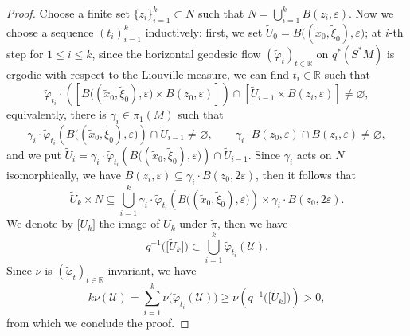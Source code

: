 \documentclass[11pt,oneside,reqno]{amsart}
\theoremstyle{definition}
\numberwithin{equation}{section}
\theoremstyle{plain}
\begin{document}
\begin{proof}
Choose a finite set $\{z_i\}_{i=1}^k \subset N$ such that $N=\bigcup_{i=1}^k B(z_i, \varepsilon)$. Now we choose a sequence $(t_i)_{i=1}^k$ inductively: first, we set $\widetilde{U}_0=B\big((\widetilde{x}_0, \widetilde{\xi}_0), \varepsilon\big)$; at $i$-th step for $1 \leq i \leq k$, since the horizontal geodesic flow $(\widetilde{\varphi}_t)_{t \in \mathbb{R}}$ on $q^*(S^*M)$ is ergodic with respect to the Liouville measure, we can find $t_i \in \mathbb{R}$ such that
\begin{equation*}
    \widetilde{\varphi}_{t_i} \cdot\left(\left[B\big((\widetilde{x}_0, \widetilde{\xi}_0), \varepsilon\big) \times B\left(z_0, \varepsilon\right)\right]\right) \cap\left[\widetilde{U}_{i-1} \times B\left(z_i, \varepsilon\right)\right] \neq \varnothing,
\end{equation*}
equivalently, there is $\gamma_i \in \pi_1(M)$ such that
\begin{equation*}
    \gamma_i \cdot \widetilde{\varphi}_{t_i}\left(B\big((\widetilde{x}_0, \widetilde{\xi}_0), \varepsilon\big)\right) \cap \widetilde{U}_{i-1} \neq \varnothing, \qquad \gamma_i \cdot B\left(z_0, \varepsilon\right) \cap B\left(z_i, \varepsilon\right) \neq \varnothing,
\end{equation*}
and we put $\widetilde{U}_i=\gamma_i \cdot \widetilde{\varphi}_{t_i}\left(B\big((\widetilde{x}_0, \widetilde{\xi}_0), \varepsilon\big)\right) \cap \widetilde{U}_{i-1}$. Since $\gamma_i$ acts on $N$ isomorphically,  we have $B\left(z_i, \varepsilon\right) \subseteq \gamma_i \cdot B\left(z_0, 2 \varepsilon\right)$, then it follows that
\begin{equation*}
    \widetilde{U}_k \times N \subseteq \bigcup_{i=1}^k \gamma_i \cdot \widetilde{\varphi}_{t_i}\left(B\big((\widetilde{x}_0, \widetilde{\xi}_0), \varepsilon\big)\right) \times \gamma_i \cdot B\left(z_0, 2 \varepsilon\right) .
\end{equation*}
We denote by $\big[\widetilde{U}_k\big]$ the image of $\widetilde{U}_k$ under $\widetilde{\pi}$, then we have
\begin{equation*}
    q^{-1}\big(\big[\widetilde{U}_k\big]\big) \subset \bigcup_{i=1}^k\widetilde{\varphi}_{t_i}(\mathcal{U}).
\end{equation*}
Since $\nu$ is $(\widetilde{\varphi}_t)_{t \in \mathbb{R}}$-invariant, we have
\begin{equation*}
    k \nu(\mathcal{U})=\sum_{i=1}^k \nu\big(\widetilde{\varphi}_{t_i}(\mathcal{U}) \big) \geq \nu\left(q^{-1}\big(\big[\widetilde{U}_k\big]\big) \right)>0,
\end{equation*}
from which we conclude the proof.
\end{proof}
\end{document}
